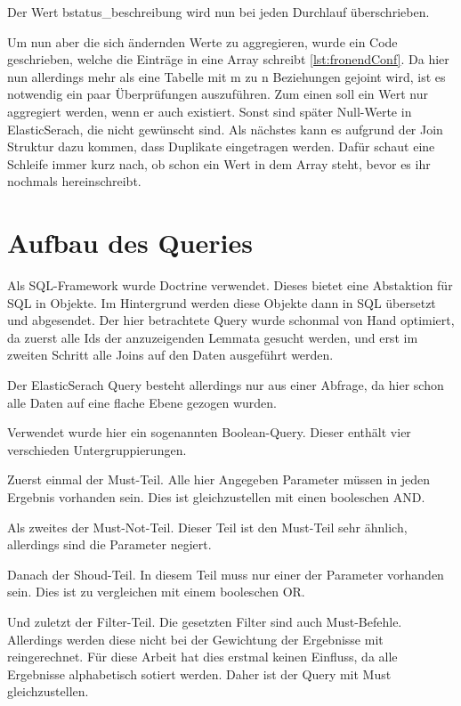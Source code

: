 Der Wert bstatus\_beschreibung wird nun bei jeden Durchlauf überschrieben. 

Um nun aber die sich ändernden Werte zu aggregieren, wurde ein Code geschrieben, welche die Einträge in eine Array schreibt \ref{lst:fronendConf}. Da hier nun allerdings mehr als eine Tabelle mit m zu n Beziehungen gejoint wird, ist es notwendig ein paar Überprüfungen auszuführen. Zum einen soll ein Wert nur aggregiert werden, wenn er auch existiert. Sonst sind später Null-Werte in ElasticSerach, die nicht gewünscht sind. Als nächstes kann es aufgrund der Join Struktur dazu kommen, dass Duplikate eingetragen werden. Dafür schaut eine Schleife immer kurz nach, ob schon ein Wert in dem Array steht, bevor es ihr nochmals hereinschreibt. 

\section{Aufbau des Queries}

Als SQL-Framework wurde Doctrine verwendet. Dieses bietet eine Abstaktion für SQL in Objekte. Im Hintergrund werden diese Objekte dann in SQL übersetzt und abgesendet. Der hier betrachtete Query wurde schonmal von Hand optimiert, da zuerst alle Ids der anzuzeigenden Lemmata gesucht werden, und erst im zweiten Schritt alle Joins auf den Daten ausgeführt werden.

Der ElasticSerach Query besteht allerdings nur aus einer Abfrage, da hier schon alle Daten auf eine flache Ebene gezogen wurden.

Verwendet wurde hier ein sogenannten Boolean-Query. Dieser enthält vier verschieden Untergruppierungen.

Zuerst einmal der Must-Teil. Alle hier Angegeben Parameter müssen in jeden Ergebnis vorhanden sein. Dies ist gleichzustellen mit einen booleschen AND. 

Als zweites der Must-Not-Teil. Dieser Teil ist den Must-Teil sehr ähnlich, allerdings sind die Parameter negiert.

Danach der Shoud-Teil. In diesem Teil muss nur einer der Parameter vorhanden sein. Dies ist zu vergleichen mit einem booleschen OR. 

Und zuletzt der Filter-Teil. Die gesetzten Filter sind auch Must-Befehle. Allerdings werden diese nicht bei der Gewichtung der Ergebnisse mit reingerechnet. Für diese Arbeit hat dies erstmal keinen Einfluss, da alle Ergebnisse alphabetisch sotiert werden. Daher ist der Query mit Must gleichzustellen. \cite{ElasticsearchB.V..17.12.2019}


